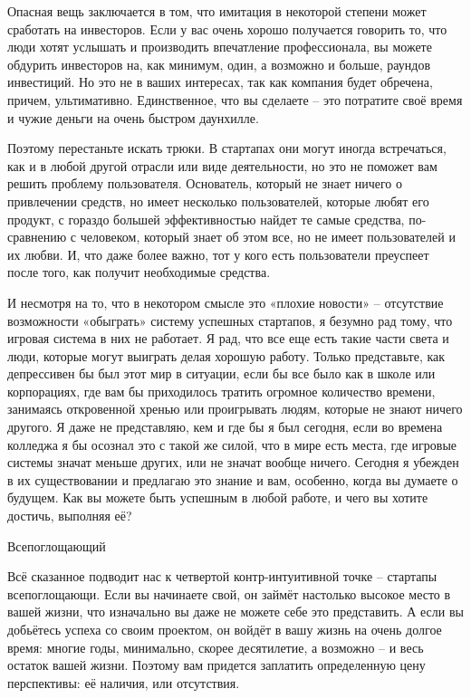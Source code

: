 \documentclass[ebook,12pt,oneside,openany]{memoir}
\begin{document}
Опасная вещь заключается в том, что имитация в некоторой степени может
сработать на инвесторов. Если у вас очень хорошо получается говорить
то, что люди хотят услышать и производить впечатление профессионала,
вы можете обдурить инвесторов на, как минимум, один, а возможно и
больше, раундов инвестиций. Но это не в ваших интересах, так как
компания будет обречена, причем, ультимативно. Единственное, что вы
сделаете – это потратите своё время и чужие деньги на очень быстром
даунхилле.

Поэтому перестаньте искать трюки. В стартапах они могут иногда
встречаться, как и в любой другой отрасли или виде деятельности, но
это не поможет вам решить проблему пользователя. Основатель, который
не знает ничего о привлечении средств, но имеет несколько
пользователей, которые любят его продукт, с гораздо большей
эффективностью найдет те самые средства, по-сравнению с человеком,
который знает об этом все, но не имеет пользователей и их любви. И,
что даже более важно, тот у кого есть пользователи преуспеет после
того, как получит необходимые средства.

И несмотря на то, что в некотором смысле это «плохие новости» –
отсутствие возможности «обыграть» систему успешных стартапов, я
безумно рад тому, что игровая система в них не работает. Я рад, что
все еще есть такие части света и люди, которые могут выиграть делая
хорошую работу. Только представьте, как депрессивен бы был этот мир в
ситуации, если бы все было как в школе или корпорациях, где вам бы
приходилось тратить огромное количество времени, занимаясь откровенной
хренью или проигрывать людям, которые не знают ничего другого. Я даже
не представляю, кем и где бы я был сегодня, если во времена колледжа я
бы осознал это с такой же силой, что в мире есть места, где игровые
системы значат меньше других, или не значат вообще ничего. Сегодня я
убежден в их существовании и предлагаю это знание и вам, особенно,
когда вы думаете о будущем. Как вы можете быть успешным в любой
работе, и чего вы хотите достичь, выполняя её?

Всепоглощающий

Всё сказанное подводит нас к четвертой контр-интуитивной точке –
стартапы всепоглощающи. Если вы начинаете свой, он займёт настолько
высокое место в вашей жизни, что изначально вы даже не можете себе это
представить. А если вы добьётесь успеха со своим проектом, он войдёт в
вашу жизнь на очень долгое время: многие годы, минимально, скорее
десятилетие, а возможно – и весь остаток вашей жизни. Поэтому вам
придется заплатить определенную цену перспективы: её наличия, или
отсутствия.
\end{document}
